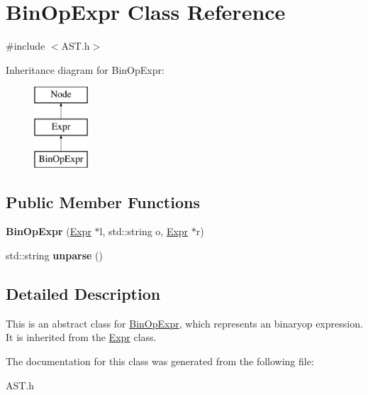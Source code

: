 \hypertarget{class_bin_op_expr}{}\section{Bin\+Op\+Expr Class Reference}
\label{class_bin_op_expr}


{\ttfamily \#include $<$A\+S\+T.\+h$>$}

Inheritance diagram for Bin\+Op\+Expr\+:\begin{figure}[H]
\begin{center}
\leavevmode
\includegraphics[height=3.000000cm]{class_bin_op_expr}
\end{center}
\end{figure}
\subsection*{Public Member Functions}
\begin{DoxyCompactItemize}
\item 
\hypertarget{class_bin_op_expr_ad9356086916b52b35c6874c2acfc556f}{}{\bfseries Bin\+Op\+Expr} (\hyperlink{class_expr}{Expr} $\ast$l, std\+::string o, \hyperlink{class_expr}{Expr} $\ast$r)\label{class_bin_op_expr_ad9356086916b52b35c6874c2acfc556f}

\item 
\hypertarget{class_bin_op_expr_a695fc973bc681fcceda2f81130098649}{}std\+::string {\bfseries unparse} ()\label{class_bin_op_expr_a695fc973bc681fcceda2f81130098649}

\end{DoxyCompactItemize}


\subsection{Detailed Description}
This is an abstract class for \hyperlink{class_bin_op_expr}{Bin\+Op\+Expr}, which represents an binaryop expression. It is inherited from the \hyperlink{class_expr}{Expr} class. 

The documentation for this class was generated from the following file\+:\begin{DoxyCompactItemize}
\item 
A\+S\+T.\+h\end{DoxyCompactItemize}
